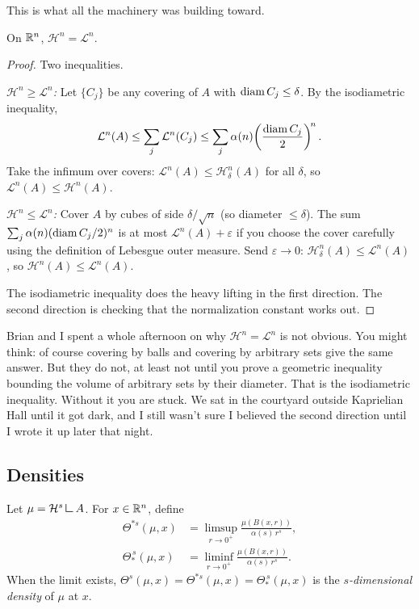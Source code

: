 This is what all the machinery was building toward.

\begin{theorem}\label{thm:Hn-equals-Ln}
On $\mathbb{R}^n$, $\mathcal{H}^n = \mathcal{L}^n$.
\end{theorem}

\begin{proof}
Two inequalities.

\emph{$\mathcal{H}^n \ge \mathcal{L}^n$:} Let $\{C_j\}$ be any covering
of $A$ with $\operatorname{diam} C_j \le \delta$. By the isodiametric inequality,
\[
  \mathcal{L}^n(A) \le \sum_j \mathcal{L}^n(C_j)
  \le \sum_j \alpha(n)\!\left(\frac{\operatorname{diam} C_j}{2}\right)^{\!n}.
\]
Take the infimum over covers:
$\mathcal{L}^n(A) \le \mathcal{H}^n_\delta(A)$ for all $\delta$, so
$\mathcal{L}^n(A) \le \mathcal{H}^n(A)$.

\emph{$\mathcal{H}^n \le \mathcal{L}^n$:} Cover $A$ by cubes of side
$\delta/\sqrt{n}$ (so diameter $\le \delta$). The sum
$\sum_j \alpha(n)(\operatorname{diam} C_j/2)^n$ is at most $\mathcal{L}^n(A) +
\varepsilon$ if you choose the cover carefully using the definition of
Lebesgue outer measure. Send $\varepsilon \to 0$:
$\mathcal{H}^n_\delta(A) \le \mathcal{L}^n(A)$, so
$\mathcal{H}^n(A) \le \mathcal{L}^n(A)$.

The isodiametric inequality does the heavy lifting in the first direction.
The second direction is checking that the normalization constant works
out. \qedhere
\end{proof}

Brian and I spent a whole afternoon on why $\mathcal{H}^n = \mathcal{L}^n$
is not obvious. You might think: of course covering by balls and covering by
arbitrary sets give the same answer. But they do not, at least not until you prove a
geometric inequality bounding the volume of arbitrary sets by their diameter. That is the isodiametric inequality. Without it you are stuck. We sat in the courtyard outside Kaprielian Hall until it got dark, and I still wasn't sure I believed the second direction until I wrote it up later that night.


\subsection{Densities}\label{subsec:densities}

\begin{definition}%
\label{def:densities}
Let $\mu = \mathcal{H}^s \mres A$. For $x \in \mathbb{R}^n$, define
\begin{align*}
  \Theta^{*s}(\mu, x)
    &= \limsup_{r \to 0^+} \frac{\mu(B(x,r))}{\alpha(s)\, r^s}, \\
  \Theta_*^{\,s}(\mu, x)
    &= \liminf_{r \to 0^+} \frac{\mu(B(x,r))}{\alpha(s)\, r^s}.
\end{align*}
When the limit exists,
$\Theta^s(\mu, x) = \Theta^{*s}(\mu, x) = \Theta_*^{\,s}(\mu, x)$ is
the \emph{$s$-dimensional density} of $\mu$ at $x$.
\end{definition}

